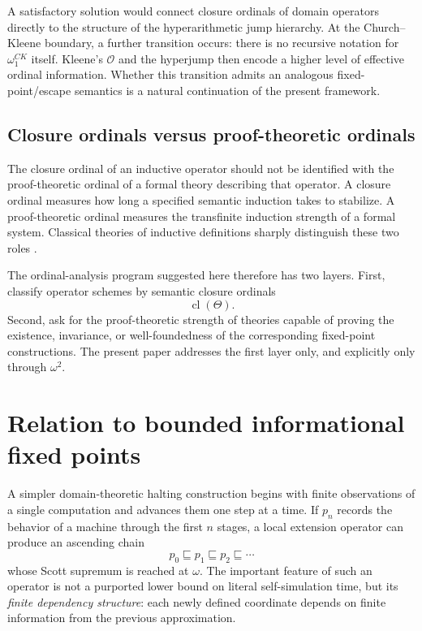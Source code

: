 \documentclass[11pt]{article}
\theoremstyle{definition}
\theoremstyle{remark}
\newcommand{\cl}{\operatorname{cl}}
\begin{document}
A satisfactory solution would connect closure ordinals of domain operators directly to the structure of the hyperarithmetic jump hierarchy. At the Church--Kleene boundary, a further transition occurs: there is no recursive notation for $\omega_1^{CK}$ itself. Kleene's $\mathcal O$ and the hyperjump then encode a higher level of effective ordinal information. Whether this transition admits an analogous fixed-point/escape semantics is a natural continuation of the present framework.

\subsection{Closure ordinals versus proof-theoretic ordinals}

The closure ordinal of an inductive operator should not be identified with the proof-theoretic ordinal of a formal theory describing that operator. A closure ordinal measures how long a specified semantic induction takes to stabilize. A proof-theoretic ordinal measures the transfinite induction strength of a formal system. Classical theories of inductive definitions sharply distinguish these two roles \cite{Aczel1977}.

The ordinal-analysis program suggested here therefore has two layers. First, classify operator schemes by semantic closure ordinals
\[
\cl(\Theta).
\]
Second, ask for the proof-theoretic strength of theories capable of proving the existence, invariance, or well-foundedness of the corresponding fixed-point constructions. The present paper addresses the first layer only, and explicitly only through $\omega^2$.

\section{Relation to bounded informational fixed points}

A simpler domain-theoretic halting construction begins with finite observations of a single computation and advances them one step at a time. If $p_n$ records the behavior of a machine through the first $n$ stages, a local extension operator can produce an ascending chain
\[
p_0\sqsubseteq p_1\sqsubseteq p_2\sqsubseteq\cdots
\]
whose Scott supremum is reached at $\omega$. The important feature of such an operator is not a purported lower bound on literal self-simulation time, but its \emph{finite dependency structure}: each newly defined coordinate depends on finite information from the previous approximation.
\end{document}
